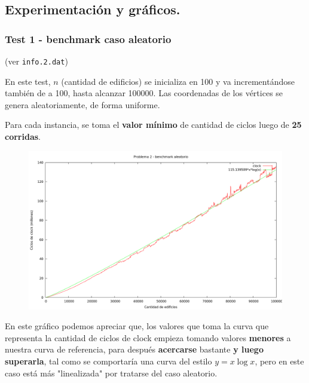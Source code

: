 \newpage


\subsection{Experimentación y gráficos.}

\vspace*{0.3cm}

\subsubsection{Test 1 - benchmark caso aleatorio}

(ver \verb|info.2.dat|) \medskip

En este test, $n$ (cantidad de edificios) se inicializa en 100 y va incrementándose también de a 100,
hasta alcanzar 100000. Las coordenadas de los vértices se genera aleatoriamente, de forma uniforme.

Para cada instancia, se toma el \textbf{valor mínimo} de cantidad de ciclos luego de \textbf{25 corridas}.

\vspace*{0.5cm}

\begin{figure}[h]
  \begin{center}
    \includegraphics[scale=0.35]{imagenes/grafico-2.png}
  \end{center}
\end{figure}

\vspace*{0.5cm}

En este gráfico podemos apreciar que, los valores que toma la curva que representa la cantidad de ciclos
de clock empieza tomando valores \textbf{menores} a nuestra curva de referencia, para después \textbf{acercarse} bastante \textbf{y
luego superarla}, tal como se comportaría una curva del estilo $y = x \log x$, pero en este caso está más
"linealizada" por tratarse del caso aleatorio.


